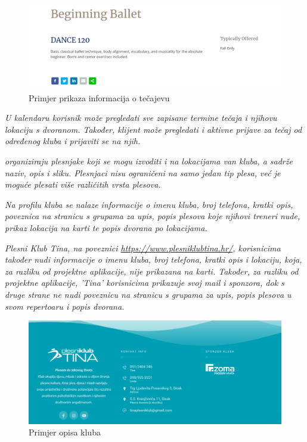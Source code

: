 \begin{figure}[H]
	\centering
	\includegraphics[scale=0.3]{slike/opis_2.png}
	\caption{Primjer prikaza informacija o tečajevu}
	\label{fig:screenshot002}
\end{figure}

\textit{ U kalendaru korisnik može pregledati sve zapisane termine tečaja i njihovu lokaciju s dvoranom. Također, klijent može pregledati i aktivne prijave za tečaj od određenog kluba i prijaviti se na njih.}

\textit{ organiziraju plesnjake koji se mogu izvoditi i na lokacijama van kluba, a sadrže naziv, opis i sliku. Plesnjaci nisu ograničeni na samo jedan tip plesa, već je moguće plesati više različitih vrsta plesova.}

\textit{Na profilu kluba se nalaze informacije o imenu kluba, broj telefona, kratki opis, poveznica na stranicu s grupama za upis, popis plesova koje njihovi treneri nude, prikaz lokacija na karti te popis dvorana po lokacijama.}

\textit{Plesni Klub Tina, na poveznici \url{https://www.plesniklubtina.hr/}, korisnicima također nudi informacije o imenu kluba, broj telefona, kratki opis i lokaciju, koja, za razliku od projektne aplikacije, nije prikazana na karti. Također, za razliku od projektne aplikacije, 'Tina' korisnicima prikazuje svoj mail i sponzora, dok s druge strane ne nudi poveznicu na stranicu s grupama za upis, popis plesova u svom repertoaru i popis dvorana.}

\begin{figure}[H]
	\centering
	\includegraphics[scale=0.3]{slike/opis_3.png}
	\caption{Primjer opisa kluba}
	\label{fig:screenshot003}
\end{figure}

